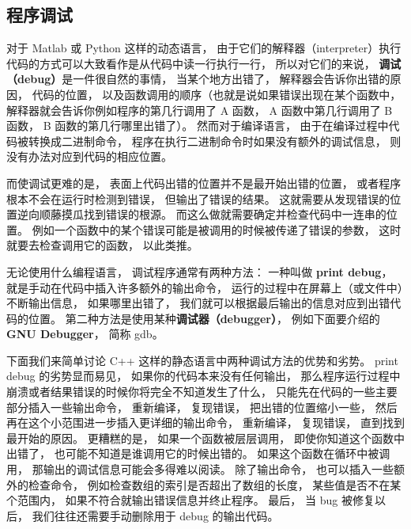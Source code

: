 
\begin{issues}
\issueTODO
{}
\end{issues}

\subsection{程序调试}

对于 Matlab 或 Python 这样的动态语言， 由于它们的解释器（interpreter）执行代码的方式可以大致看作是从代码中读一行执行一行， 所以对它们的来说， \textbf{调试（debug）}是一件很自然的事情， 当某个地方出错了， 解释器会告诉你出错的原因， 代码的位置， 以及函数调用的顺序（也就是说如果错误出现在某个函数中， 解释器就会告诉你例如程序的第几行调用了 A 函数， A 函数中第几行调用了 B 函数， B 函数的第几行哪里出错了）。 然而对于编译语言， 由于在编译过程中代码被转换成二进制命令， 程序在执行二进制命令时如果没有额外的调试信息， 则没有办法对应到代码的相应位置。

而使调试更难的是， 表面上代码出错的位置并不是最开始出错的位置， 或者程序根本不会在运行时检测到错误， 但输出了错误的结果。 这就需要从发现错误的位置逆向顺藤摸瓜找到错误的根源。 而这么做就需要确定并检查代码中一连串的位置。 例如一个函数中的某个错误可能是被调用的时候被传递了错误的参数， 这时就要去检查调用它的函数， 以此类推。

无论使用什么编程语言， 调试程序通常有两种方法： 一种叫做 \textbf{print debug}， 就是手动在代码中插入许多额外的输出命令， 运行的过程中在屏幕上（或文件中）不断输出信息， 如果哪里出错了， 我们就可以根据最后输出的信息对应到出错代码的位置。 第二种方法是使用某种\textbf{调试器（debugger）}， 例如下面要介绍的 \textbf{GNU Debugger}， 简称 gdb。

下面我们来简单讨论 C++ 这样的静态语言中两种调试方法的优势和劣势。 print debug 的劣势显而易见， 如果你的代码本来没有任何输出， 那么程序运行过程中崩溃或者结果错误的时候你将完全不知道发生了什么， 只能先在代码的一些主要部分插入一些输出命令， 重新编译， 复现错误， 把出错的位置缩小一些， 然后再在这个小范围进一步插入更详细的输出命令， 重新编译， 复现错误， 直到找到最开始的原因。 更糟糕的是， 如果一个函数被层层调用， 即使你知道这个函数中出错了， 也可能不知道是谁调用它的时候出错的。 如果这个函数在循环中被调用， 那输出的调试信息可能会多得难以阅读。 除了输出命令， 也可以插入一些额外的检查命令， 例如检查数组的索引是否超出了数组的长度， 某些值是否不在某个范围内， 如果不符合就输出错误信息并终止程序。 最后， 当 bug 被修复以后， 我们往往还需要手动删除用于 debug 的输出代码。

